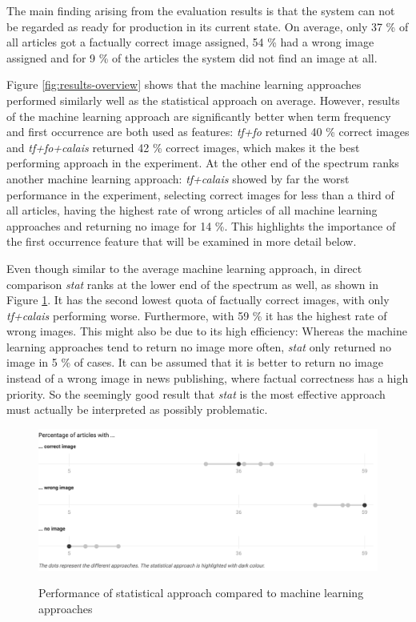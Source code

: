 \documentclass[11pt,a4paper,twoside]{article}
\begin{document}
The main finding arising from the evaluation results is that the system can not be regarded as ready for production in its current state. On average, only 37 \% of all articles got a factually correct image assigned, 54 \% had a wrong image assigned and for 9 \% of the articles the system did not find an image at all.

Figure \ref{fig:results-overview} shows that the machine learning approaches performed similarly well as the statistical approach on average. However, results of the machine learning approach are significantly better when term frequency and first occurrence are both used as features: \emph{tf+fo} returned 40 \% correct images and \emph{tf+fo+calais} returned 42 \% correct images, which makes it the best performing approach in the experiment. At the other end of the spectrum ranks another machine learning approach: \emph{tf+calais} showed by far the worst performance in the experiment, selecting correct images for less than a third of all articles, having the highest rate of wrong articles of all machine learning approaches and returning no image for 14 \%. This highlights the importance of the first occurrence feature that will be examined in more detail below.

Even though similar to the average machine learning approach, in direct comparison \emph{stat} ranks at the lower end of the spectrum as well, as shown in Figure \ref{fig:stat-comparison}. It has the second lowest quota of factually correct images, with only \emph{tf+calais} performing worse. Furthermore, with 59 \% it has the highest rate of wrong images. This might also be due to its high efficiency: Whereas the machine learning approaches tend to return no image more often, \emph{stat} only returned no image in 5 \% of cases. It can be assumed that it is better to return no image instead of a wrong image in news publishing, where factual correctness has a high priority. So the seemingly good result that \emph{stat} is the most effective approach must actually be interpreted as possibly problematic.

\begin{figure}[h]
    \caption{Performance of statistical approach compared to machine learning approaches}
    \centering
    \includegraphics[width=\columnwidth]{fig-stat-comparison.png}
    \label{fig:stat-comparison}
\end{figure}
\end{document}
